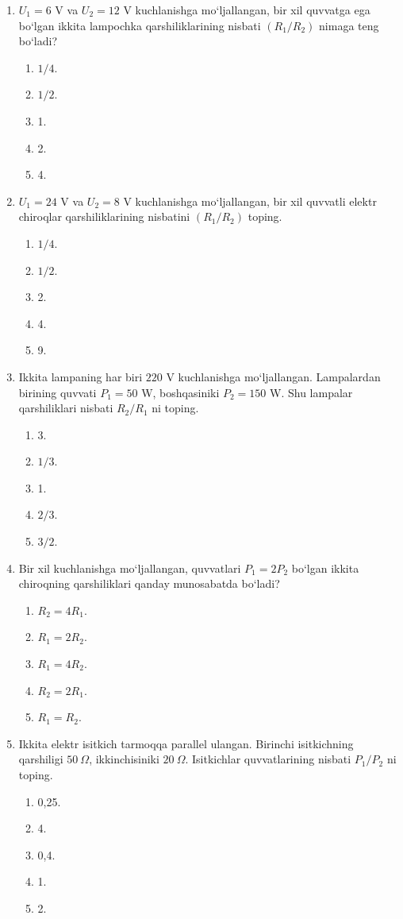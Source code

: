 \begin{enumerate}
\item $U_1=6$ V va $U_2=12$ V kuchlanishga mo‘ljallangan, bir xil quvvatga ega bo‘lgan ikkita lampochka qarshiliklarining nisbati $(R_1/R_2)$ nimaga teng bo‘ladi?
\begin{enumerate}[label=\Alph*)]
\item $1/4$.
\item $1/2$.
\item 1.
\item 2.
\item 4.
\end{enumerate}

\item $U_1=24$ V va $U_2=8$ V kuchlanishga mo‘ljallangan, bir xil quvvatli elektr chiroqlar qarshiliklarining nisbatini $(R_1/R_2)$ toping.
\begin{enumerate}[label=\Alph*)]
\item $1/4$.
\item $1/2$.
\item 2.
\item 4.
\item 9.
\end{enumerate}

\item Ikkita lampaning har biri $220$ V kuchlanishga mo‘ljallangan. Lampalardan birining quvvati $P_1=50$ W, boshqasiniki $P_2=150$ W. Shu lampalar qarshiliklari nisbati $R_2/R_1$ ni toping.
\begin{enumerate}[label=\Alph*)]
\item 3.
\item $1/3$.
\item 1.
\item $2/3$.
\item $3/2$.
\end{enumerate}

\item Bir xil kuchlanishga mo‘ljallangan, quvvatlari $P_1=2P_2$ bo‘lgan ikkita chiroqning qarshiliklari qanday munosabatda bo‘ladi?
\begin{enumerate}[label=\Alph*)]
\item $R_2=4R_1$.
\item $R_1=2R_2$.
\item $R_1=4R_2$.
\item $R_2=2R_1$.
\item $R_1=R_2$.
\end{enumerate}

\item Ikkita elektr isitkich tarmoqqa parallel ulangan. Birinchi isitkichning qarshiligi $50~\Omega$, ikkinchisiniki $20~\Omega$. Isitkichlar quvvatlarining nisbati $P_1/P_2$ ni toping.
\begin{enumerate}[label=\Alph*)]
\item 0,25.
\item 4.
\item 0,4.
\item 1.
\item 2.
\end{enumerate}


\end{enumerate}
